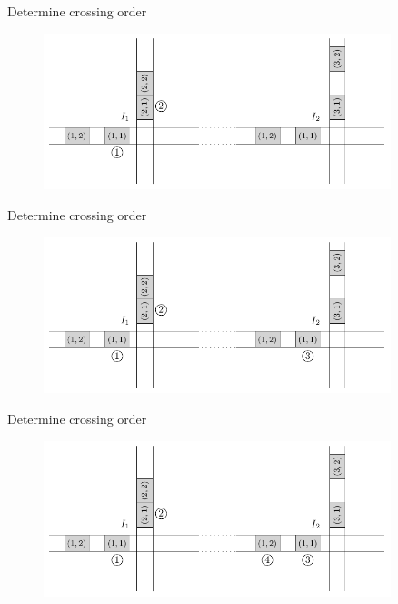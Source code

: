 \documentclass[bigger]{beamer}
\begin{document}
\begin{frame}[label={sec:org2d4499b}]{Determine crossing order}
\addtocounter{framenumber}{-1}
\begin{figure}
  \centering
  \includegraphics[width=0.9\textwidth]{figures/network_ordering-2.pdf}
\end{figure}
\end{frame}
\begin{frame}[label={sec:org258b8d4}]{Determine crossing order}
\addtocounter{framenumber}{-1}
\begin{figure}
  \centering
  \includegraphics[width=0.9\textwidth]{figures/network_ordering-3.pdf}
\end{figure}
\end{frame}
\begin{frame}[label={sec:org7d05a17}]{Determine crossing order}
\addtocounter{framenumber}{-1}
\begin{figure}
  \centering
  \includegraphics[width=0.9\textwidth]{figures/network_ordering-4.pdf}
\end{figure}
\end{frame}
\end{document}
